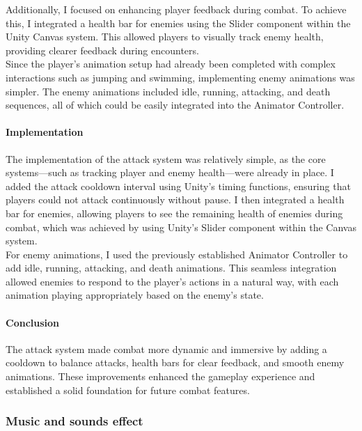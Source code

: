 \documentclass{article}
\begin{document}
Additionally, I focused on enhancing player feedback during combat. To achieve this, I integrated a health bar for enemies using the Slider component within the Unity Canvas system. This allowed players to visually track enemy health, providing clearer feedback during encounters.\\

Since the player's animation setup had already been completed with complex interactions such as jumping and swimming, implementing enemy animations was simpler. The enemy animations included idle, running, attacking, and death sequences, all of which could be easily integrated into the Animator Controller.

\paragraph{Implementation}\hfill

The implementation of the attack system was relatively simple, as the core systems—such as tracking player and enemy health—were already in place. I added the attack cooldown interval using Unity's timing functions, ensuring that players could not attack continuously without pause. I then integrated a health bar for enemies, allowing players to see the remaining health of enemies during combat, which was achieved by using Unity's Slider component within the Canvas system.\\

For enemy animations, I used the previously established Animator Controller to add idle, running, attacking, and death animations. This seamless integration allowed enemies to respond to the player's actions in a natural way, with each animation playing appropriately based on the enemy's state.

\paragraph{Conclusion}\hfill

The attack system made combat more dynamic and immersive by adding a cooldown to balance attacks, health bars for clear feedback, and smooth enemy animations. These improvements enhanced the gameplay experience and established a solid foundation for future combat features.



\subsubsection{Music and sounds effect}
\end{document}
